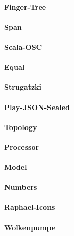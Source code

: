 \documentclass[11pt,a4paper]{article}
\begin{document}
\paragraph{Finger-Tree}

\paragraph{Span}

\paragraph{Scala-OSC}

\paragraph{Equal}

\paragraph{Strugatzki}

\paragraph{Play-JSON-Sealed}

\paragraph{Topology}

\paragraph{Processor}

\paragraph{Model}

\paragraph{Numbers}

\paragraph{Raphael-Icons}

\paragraph{Wolkenpumpe}
\end{document}
